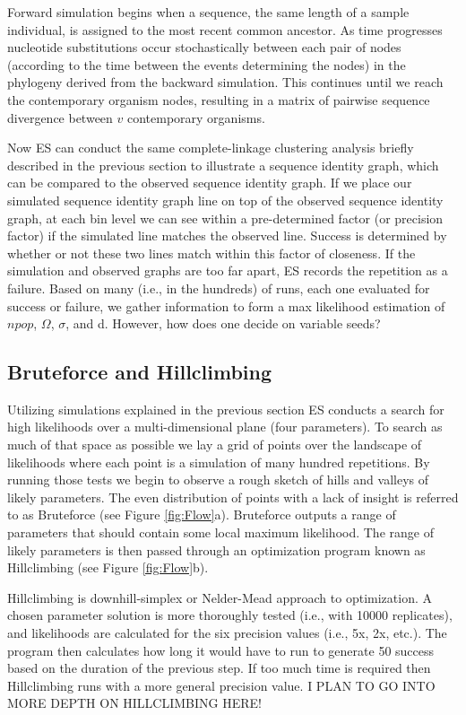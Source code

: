 Forward simulation begins when a sequence, the same length of a sample individual, is assigned to the most recent common ancestor.
As time progresses nucleotide substitutions occur stochastically between each pair of nodes (according to the time between the events determining the nodes) in the phylogeny derived from the backward simulation. 
This continues until we reach the contemporary organism nodes, resulting in a matrix of pairwise sequence divergence between $v$ contemporary organisms.

Now ES can conduct the same complete-linkage clustering analysis briefly described in the previous section to illustrate a sequence identity graph, which can be compared to the observed sequence identity graph.
If we place our simulated sequence identity graph line on top of the observed sequence identity graph, at each bin level we can see within a pre-determined factor (or precision factor) if the simulated line matches the observed line.
Success is determined by whether or not these two lines match within this factor of closeness.
If the simulation and observed graphs are too far apart, ES records the repetition as a failure.
Based on many (i.e., in the hundreds) of runs, each one evaluated for success or failure, we gather information to form a max likelihood estimation of $npop$, $\Omega$, $\sigma$, and d. However, how does one decide on variable seeds?

\subsection*{Bruteforce and Hillclimbing}
Utilizing simulations explained in the previous section ES conducts a search for high likelihoods over a multi-dimensional plane (four parameters).
To search as much of that space as possible we lay a grid of points over the landscape of likelihoods where each point is a simulation of many hundred repetitions.
By running those tests we begin to observe a rough sketch of hills and valleys of likely parameters.
The even distribution of points with a lack of insight is referred to as Bruteforce (see Figure \ref{fig:Flow}a).
Bruteforce outputs a range of parameters that should contain some local maximum likelihood.
The range of likely parameters is then passed through an optimization program known as Hillclimbing (see Figure \ref{fig:Flow}b).

Hillclimbing is  downhill-simplex or Nelder-Mead approach to optimization.
A chosen parameter solution is more thoroughly tested (i.e., with 10000 replicates), and likelihoods are calculated for the six precision values (i.e., 5x, 2x, etc.).
The program then calculates how long it would have to run to generate 50 success based on the duration of the previous step.
If too much time is required then Hillclimbing runs with a more general precision value.
I PLAN TO GO INTO MORE DEPTH ON HILLCLIMBING HERE!


